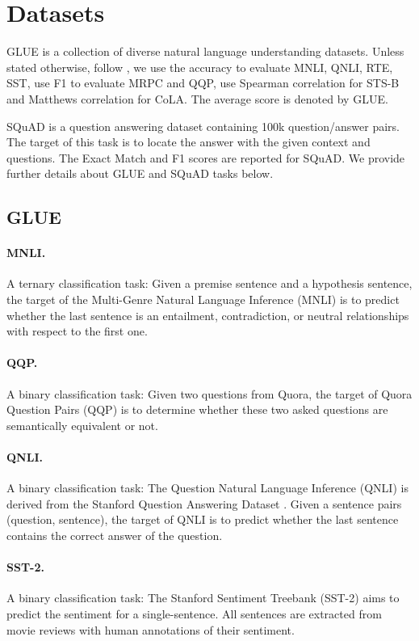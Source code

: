 \documentclass[letterpaper]{article} \usepackage{aaai22}  \usepackage{times}  \usepackage{helvet}  \usepackage{courier}  \usepackage[hyphens]{url}  \usepackage{graphicx} \urlstyle{rm} \def\UrlFont{\rm}  \usepackage{natbib}  \usepackage{caption} \DeclareCaptionStyle{ruled}{labelfont=normalfont,labelsep=colon,strut=off} \frenchspacing  \setlength{\pdfpagewidth}{8.5in}  \setlength{\pdfpageheight}{11in}  \usepackage{algorithm}
\begin{document}
\section{Datasets}
GLUE is a collection of diverse natural language understanding datasets. Unless stated otherwise, follow \citep{devlin2019bert}, we use the accuracy to evaluate MNLI, QNLI, RTE, SST, use F1 to evaluate MRPC and QQP, use Spearman correlation for STS-B and Matthews correlation for CoLA. The average score is denoted by GLUE. 

SQuAD is a question answering dataset containing 100k question/answer pairs. The target of this task is to locate the answer with the given context and questions. The Exact Match and F1 scores are reported for SQuAD. We provide further details about GLUE and SQuAD tasks below.

\subsection{GLUE}
\paragraph{MNLI.}
A ternary classification task: Given a premise sentence and a hypothesis sentence, the target of the Multi-Genre Natural Language Inference (MNLI) \citep{williams2018broad} is to predict whether the last sentence is an entailment, contradiction, or neutral relationships with respect to the first one.

\paragraph{QQP.}
A binary classification task:  Given two questions from Quora, the target of Quora Question Pairs (QQP) \citep{chen2018quora} is to determine whether these two asked questions are semantically equivalent or not.

\paragraph{QNLI.}
A binary classification task: The Question Natural Language Inference (QNLI) \citep{wang2018multi} is derived from the Stanford Question Answering Dataset \citep{rajpurkar2016squad}. Given a sentence pairs (question, sentence), the target of QNLI is to predict whether the last sentence contains the correct answer of the question.

\paragraph{SST-2.}
A binary classification task: The Stanford Sentiment Treebank (SST-2) \citep{socher2013recursive} aims to predict the sentiment for a single-sentence. All sentences are extracted from movie reviews with human annotations of their sentiment.
\end{document}
